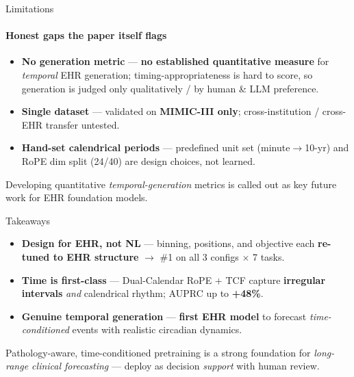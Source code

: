 \documentclass[10pt, aspectratio=169, t]{beamer}   %
\newcommand{\good}[1]{{\color{posblue}\bfseries #1}}  %
\newcommand{\warn}[1]{{\color{negmag}\bfseries #1}}   %
\newcommand{\blue}{\color{posblue}\bfseries}  %
\newcommand{\hl}{\color{posblue}\bfseries}    %
\begin{document}
\begin{frame}{Limitations}
  \framesubtitle{Honest gaps the paper itself flags}
  \vfill
  \begin{itemize}\setlength{\itemsep}{14pt}
    \item \textbf{No generation metric} --- \warn{no established quantitative measure} for \emph{temporal} EHR generation; timing-appropriateness is hard to score, so generation is judged only qualitatively / by human \& LLM preference.
    \item \textbf{Single dataset} --- validated on \warn{MIMIC-III only}; cross-institution / cross-EHR transfer untested.
    \item \textbf{Hand-set calendrical periods} --- predefined unit set (minute$\to$10-yr) and RoPE dim split (24/40) are design choices, not learned.
  \end{itemize}
  \vfill
  \begin{tcolorbox}[title={Open direction}]
    Developing quantitative \emph{temporal-generation} metrics is called out as key future work for EHR foundation models.
  \end{tcolorbox}
  \vfill
\end{frame}

\begin{frame}{Takeaways}
  \vfill
  \begin{itemize}\setlength{\itemsep}{16pt}
    \item {\large\bfseries\blue Design for EHR, not NL} \;—\; binning, positions, and objective each \good{re-tuned to EHR structure} $\to$ \#1 on all 3 configs $\times$ 7 tasks.
    \item {\large\bfseries\blue Time is first-class} \;—\; Dual-Calendar RoPE $+$ TCF capture \warn{irregular intervals} \emph{and} calendrical rhythm; AUPRC up to {\hl +48\%}.
    \item {\large\bfseries\blue Genuine temporal generation} \;—\; \good{first EHR model} to forecast \emph{time-conditioned} events with realistic circadian dynamics.
  \end{itemize}
  \vfill
  \begin{tcolorbox}[title={Medical-AI implication}]
    Pathology-aware, time-conditioned pretraining is a strong foundation for \emph{long-range clinical forecasting} --- deploy as decision \emph{support} with human review.
  \end{tcolorbox}
  \vfill
\end{frame}
\end{document}
